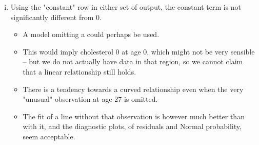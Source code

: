 \documentclass[a4paper,12pt]{article}
\begin{document}
\begin{enumerate}
\begin{enumerate}[(i)]
\item Using the "constant" row in either set of output, the constant term is
not significantly different from 0. 
\begin{itemize}
    \item A model omitting a could perhaps
be used.
   \item This would imply cholesterol 0 at age 0, which might not be very
sensible – but we do not actually have data in that region, so we
cannot claim that a linear relationship still holds.
   \item There is a tendency towards a curved relationship even when the very
"unusual" observation at age 27 is omitted. 
   \item The fit of a line without
that observation is however much better than with it, and the
diagnostic plots, of residuals and Normal probability, seem acceptable.
\end{itemize}

\end{enumerate}

\end{enumerate}
\end{document}
